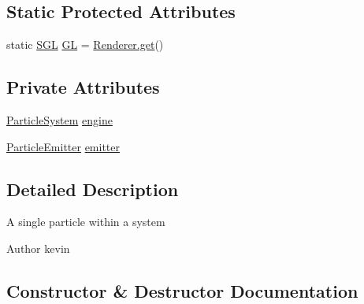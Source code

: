 \subsection*{Static Protected Attributes}
\begin{DoxyCompactItemize}
\item 
static \mbox{\hyperlink{interfaceorg_1_1newdawn_1_1slick_1_1opengl_1_1renderer_1_1_s_g_l}{S\+GL}} \mbox{\hyperlink{classorg_1_1newdawn_1_1slick_1_1particles_1_1_particle_a34f649a8e0c510c07ff601c51badaa7f}{GL}} = \mbox{\hyperlink{classorg_1_1newdawn_1_1slick_1_1opengl_1_1renderer_1_1_renderer_abe742c3a7dfca67c6c01821d27087308}{Renderer.\+get}}()
\end{DoxyCompactItemize}
\subsection*{Private Attributes}
\begin{DoxyCompactItemize}
\item 
\mbox{\hyperlink{classorg_1_1newdawn_1_1slick_1_1particles_1_1_particle_system}{Particle\+System}} \mbox{\hyperlink{classorg_1_1newdawn_1_1slick_1_1particles_1_1_particle_a92d857a3e2fba0ed564ad8e29ca3b81e}{engine}}
\item 
\mbox{\hyperlink{interfaceorg_1_1newdawn_1_1slick_1_1particles_1_1_particle_emitter}{Particle\+Emitter}} \mbox{\hyperlink{classorg_1_1newdawn_1_1slick_1_1particles_1_1_particle_a1293f2f734f0862d1263330c0d9c77c9}{emitter}}
\end{DoxyCompactItemize}


\subsection{Detailed Description}
A single particle within a system

\begin{DoxyAuthor}{Author}
kevin 
\end{DoxyAuthor}


\subsection{Constructor \& Destructor Documentation}
\mbox{\label{classorg_1_1newdawn_1_1slick_1_1particles_1_1_particle_a595d749220aa0e954debb9b464194900}} 
